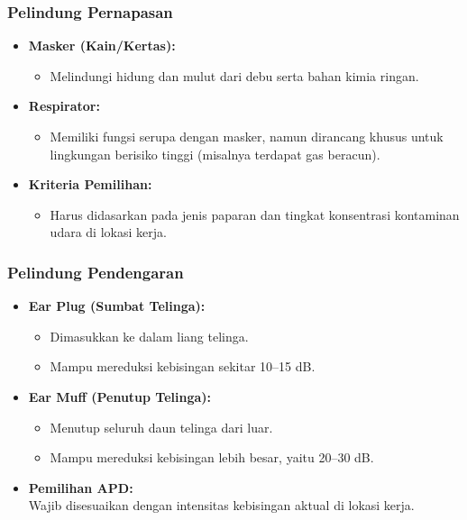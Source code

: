 \documentclass[../main.tex]{subfiles}
\begin{document}
\begin{frame}[t, mytitle=center, mycolor=digiPH_gray]
	\frametitle{Pelindung Pernapasan}
	\begin{itemize}
		\item \textbf{Masker (Kain/Kertas):}
		      \begin{itemize}
			      \item Melindungi hidung dan mulut dari debu serta bahan kimia ringan.
		      \end{itemize}
		\item \textbf{Respirator:}
		      \begin{itemize}
			      \item Memiliki fungsi serupa dengan masker, namun dirancang khusus untuk lingkungan berisiko tinggi (misalnya terdapat gas beracun).
		      \end{itemize}
		\item \textbf{Kriteria Pemilihan:}
		      \begin{itemize}
			      \item Harus didasarkan pada jenis paparan dan tingkat konsentrasi kontaminan udara di lokasi kerja.
		      \end{itemize}
	\end{itemize}
\end{frame}

\begin{frame}[c, mytitle=imageplus]
	\frametitle{Pelindung Pendengaran}
	\begin{itemize}
		\item \textbf{Ear Plug (Sumbat Telinga):}
		      \begin{itemize}
			      \item Dimasukkan ke dalam liang telinga.
			      \item Mampu mereduksi kebisingan sekitar 10–15 dB.
		      \end{itemize}
		      \vspace{0.3cm}
		\item \textbf{Ear Muff (Penutup Telinga):}
		      \begin{itemize}
			      \item Menutup seluruh daun telinga dari luar.
			      \item Mampu mereduksi kebisingan lebih besar, yaitu 20–30 dB.
		      \end{itemize}
		      \vspace{0.3cm}
		\item \textbf{Pemilihan APD:} \\ Wajib disesuaikan dengan intensitas kebisingan aktual di lokasi kerja.
	\end{itemize}
\end{frame}
\end{document}
